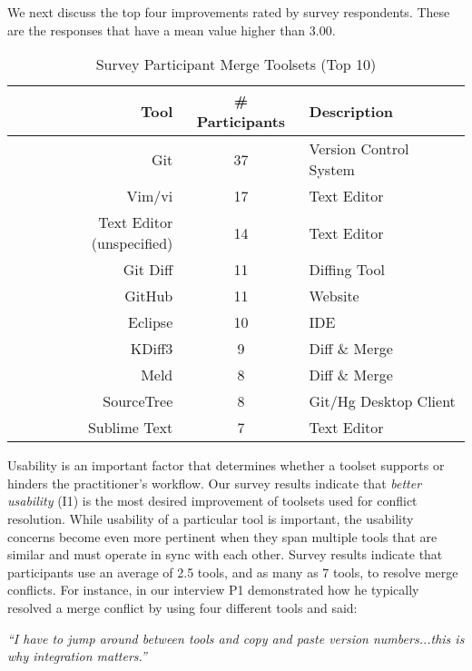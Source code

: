 We next discuss the top four improvements rated by survey respondents. These are the responses that have a mean value higher than $3.00$.

\begin{table}[!htbp]
\renewcommand{\arraystretch}{1.3}
\caption{Survey Participant Merge Toolsets (Top 10)}
\label{survey_toolset}
\centering
\begin{tabularx}{0.8\textwidth}{@{}r|Cl@{}}
\toprule
Tool & \# Participants & Description\\
\midrule
Git	& 37 & Version Control System\\
Vim/vi & 17 & Text Editor\\
Text Editor (unspecified) & 14 & Text Editor\\
Git Diff & 11 & Diffing Tool\\
GitHub & 11 & Website\\
Eclipse & 10 & IDE\\
KDiff3 & 9 & Diff \& Merge\\
Meld & 8 & Diff \& Merge\\
SourceTree & 8 & Git/Hg Desktop Client\\
Sublime Text & 7 & Text Editor\\
\bottomrule
\end{tabularx}
\end{table}

Usability is an important factor that determines whether a toolset supports or hinders the practitioner's workflow.
Our survey results indicate that \textit{better usability} (I1) is the most desired improvement of toolsets used for conflict resolution. 
While usability of a particular tool is important, the usability concerns become even more pertinent when they span multiple tools that are similar and must operate in sync with each other.
Survey results indicate that participants use an average of 2.5 tools, and as many as 7 tools, to resolve merge conflicts.
For instance, in our interview P1 demonstrated how he typically resolved a merge conflict by using four different tools and said: 
\begin{quoting}
\textit{``I have to jump around between tools and copy and paste version numbers...this is why integration matters.''}
\end{quoting}

